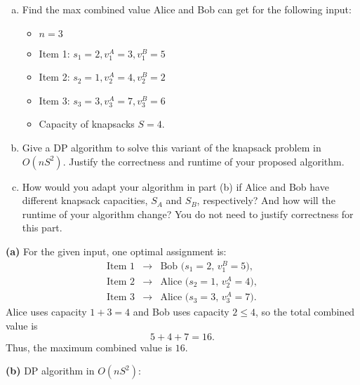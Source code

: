 \documentclass[11pt]{article}
\begin{document}
\begin{tcolorbox}[title={Problem 1 (Knapsack, Take II, 50 pts)}]
        \begin{enumerate}[(a)]
            \item Find the max combined value Alice and Bob can get for the following input:
            \begin{itemize}
                \item \( n = 3 \)
                \item Item 1: \( s_1 = 2, v_1^A = 3, v_1^B = 5 \)
                \item Item 2: \( s_2 = 1, v_2^A = 4, v_2^B = 2 \)
                \item Item 3: \( s_3 = 3, v_3^A = 7, v_3^B = 6 \)
                \item Capacity of knapsacks \(S = 4\).
            \end{itemize} 
            \item Give a DP algorithm to solve this variant of the knapsack problem in $O(nS^2)$. Justify the correctness and runtime of your proposed algorithm. 
            \item How would you adapt your algorithm in part (b) if Alice and Bob have different knapsack capacities, \(S_A\) and \(S_B\), respectively? And how will the runtime of your algorithm change? You do not need to justify correctness for this part.
        \end{enumerate}
    \end{tcolorbox}

    \textbf{(a)} For the given input, one optimal assignment is:
    \[
    \begin{array}{rcl}
    \text{Item 1} &\to& \text{Bob (} s_1=2,\, v_1^B=5\text{)},\\[1mm]
    \text{Item 2} &\to& \text{Alice (} s_2=1,\, v_2^A=4\text{)},\\[1mm]
    \text{Item 3} &\to& \text{Alice (} s_3=3,\, v_3^A=7\text{)}.
    \end{array}
    \]
    Alice uses capacity $1+3=4$ and Bob uses capacity $2\le 4$, so the total combined value is 
    \[
    5+4+7=16.
    \]
    Thus, the maximum combined value is \(\boxed{16}\).
    
    \medskip
    
    \textbf{(b)} DP algorithm in \(O(nS^2)\):
    
\end{document}
